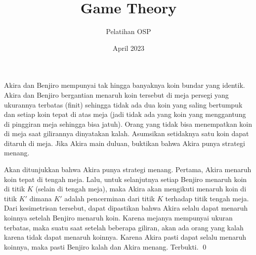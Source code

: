 \documentclass[11pt]{scrartcl}
\title{Game Theory}
\author{Pelatihan OSP}
\date{April 2023}
\begin{document}
\maketitle
\begin{soaljawab}
    Akira dan Benjiro mempunyai tak hingga banyaknya koin bundar yang identik. Akira dan Benjiro bergantian menaruh koin tersebut di meja persegi yang ukurannya terbatas (finit) sehingga tidak ada dua koin yang saling bertumpuk dan setiap koin tepat di atas meja (jadi tidak ada yang koin yang menggantung di pinggiran meja sehingga bisa jatuh). Orang yang tidak bisa menempatkan koin di meja saat gilirannya dinyatakan kalah. Asumsikan setidaknya satu koin dapat ditaruh di meja. Jika Akira main duluan, buktikan bahwa Akira punya strategi menang.\\[-10pt]
    
    \begin{solusi}
    Akan ditunjukkan bahwa Akira punya strategi menang. Pertama, Akira menaruh koin tepat di tengah meja. Lalu, untuk selanjutnya setiap Benjiro menaruh koin di titik $K$ (selain di tengah meja), maka Akira akan mengikuti menaruh koin di titik $K'$ dimana $K'$ adalah pencerminan dari titik $K$ terhadap titik tengah meja. Dari kesimetrisan tersebut, dapat dipastikan bahwa Akira selalu dapat menaruh koinnya setelah Benjiro menaruh koin. Karena mejanya mempunyai ukuran terbatas, maka suatu saat setelah beberapa giliran, akan ada orang yang kalah karena tidak dapat menaruh koinnya. Karena Akira pasti dapat selalu menaruh koinnya, maka pasti Benjiro kalah dan Akira menang. Terbukti. \qed
    \end{solusi}
\end{soaljawab}
\end{document}
